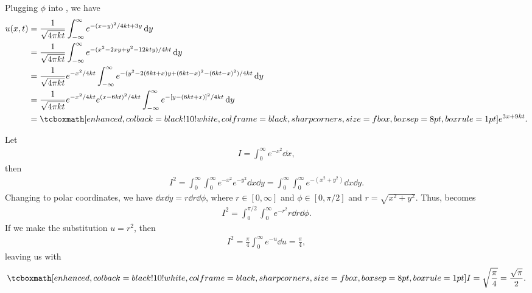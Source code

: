 \def\duedate{09/15/2022}
\def\HWnum{3}



    

Plugging $\phi$ into , we have
\begin{align}
    \label{eq:source-with-phi}
    u(x,t) &= \frac{1}{\sqrt{4 \pi k t}} \int_{-\infty}^{\infty} e^{-(x-y)^2/4kt + 3y} \dd{y} \notag \\
           &= \frac{1}{\sqrt{4 \pi k t}} \int_{-\infty}^{\infty} e^{-(x^2-2xy+y^2-12kty)/4kt} \dd{y} \notag \\
           &= \frac{1}{\sqrt{4 \pi k t}} e^{-x^2/4kt} \int_{-\infty}^{\infty} e^{-(y^2-2(6kt+x)y+(6kt-x)^2 - (6kt-x)^2)/4kt} \dd{y} \notag \\
           &= \frac{1}{\sqrt{4 \pi k t}} e^{-x^2/4kt}e^{(x-6kt)^2/4kt} \int_{-\infty}^{\infty} e^{-[y-(6kt+x)]^2/4kt} \dd{y} \notag \\
           &= \eqbox{e^{3x + 9kt}}
.\end{align}




Let
\begin{eqnarray}
    \label{eq:I-def}
    I = \int_{0}^{\infty} e^{-x^2} \dd{x}
,\end{eqnarray}
then
\begin{eqnarray}
    \label{eq:Isq}
    I^2 = \int_{0}^{\infty}\int_{0}^{\infty} e^{-x^2}e^{-y^2} \dd{x}\dd{y} = \int_{0}^{\infty}\int_{0}^{\infty} e^{-(x^2+y^2)} \dd{x}\dd{y}
.\end{eqnarray}
Changing to polar coordinates, we have $\dd{x}\dd{y} = r\dd{r}\dd{\phi}$, where $r \in [0,\infty]$ and $\phi \in [0,\pi/2]$ and $r = \sqrt{x^2 + y^2}$.
Thus,  becomes
\begin{eqnarray}
    \label{eq:Isq-polar}
    I^2 = \int_{0}^{\pi/2} \int_{0}^{\infty} e^{-r^2} r\dd{r}\dd{\phi}
.\end{eqnarray}
If we make the substitution $u = r^2$, then
\begin{eqnarray}
    \label{eq:Isq-sub}
    I^2 = \frac{\pi}{4} \int_{0}^{\infty} e^{-u} \dd{u} = \frac{\pi}{4}
,\end{eqnarray}
leaving us with
\begin{eqnarray}
    \label{eq:I-result}
    \eqbox{
    I = \sqrt{\frac{\pi}{4}} = \frac{\sqrt{\pi}}{2}
}
.\end{eqnarray}

